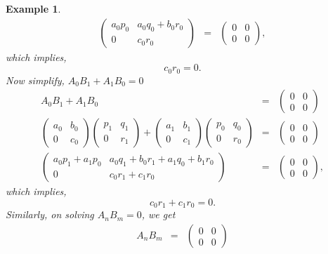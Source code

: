\documentclass[10pt,a4paper]{amsart}
\newtheorem{example}{Example}[section]
\numberwithin{equation}{section}
\begin{document}
\begin{example}
\begin{eqnarray*}
\begin{pmatrix}
	a_0p_0 & a_0q_0 + b_0r_0 \\ 0 & c_0r_0
\end{pmatrix}&=&\begin{pmatrix}
0 & 0 \\ 0 & 0
\end{pmatrix},
	\end{eqnarray*} which implies, \begin{equation}
	c_0r_0=0.
	\end{equation}
	Now simplify, $A_0B_1+A_1B_0=0$
\begin{eqnarray*}
	A_0B_1 + A_1B_0 &=&
	\begin{pmatrix}
		0 & 0 \\ 0 & 0
	\end{pmatrix} \\
	\begin{pmatrix}
		a_0 & b_0 \\ 0 & c_0
	\end{pmatrix}
	\begin{pmatrix}
		p_1 & q_1 \\ 0 & r_1
	\end{pmatrix}
	+ 
	\begin{pmatrix}
		a_1 & b_1 \\ 0 & c_1
	\end{pmatrix}
	\begin{pmatrix}
		p_0 & q_0 \\ 0 & r_0
	\end{pmatrix}
	&=&
	\begin{pmatrix}
		0 & 0 \\ 0 & 0
	\end{pmatrix} \\
	\begin{pmatrix}
		a_0p_1 + a_1p_0 & a_0q_1 + b_0r_1 + a_1q_0 + b_1r_0 \\ 
		0 & c_0r_1 + c_1r_0
	\end{pmatrix}
	&=&
	\begin{pmatrix}
		0 & 0 \\ 0 & 0
	\end{pmatrix},
\end{eqnarray*}
which implies,
\begin{equation}
	c_0r_1+c_1r_0=0.
\end{equation}Similarly, on solving $A_nB_m=0$, we get \begin{eqnarray*}
A_nB_m&=&\begin{pmatrix}
	0 & 0 \\ 0 & 0
\end{pmatrix}\\

\end{eqnarray*}
\end{example}
\end{document}
